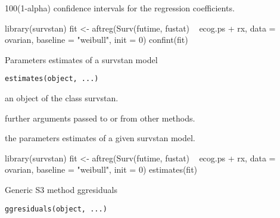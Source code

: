 \documentclass[letterpaper]{book}
\begin{document}
%
\begin{Value}
100(1-alpha) confidence intervals for the regression coefficients.
\end{Value}
%
\begin{Examples}
\begin{ExampleCode}

library(survstan)
fit <- aftreg(Surv(futime, fustat) ~ ecog.ps + rx, data = ovarian, baseline = "weibull", init = 0)
confint(fit)


\end{ExampleCode}
\end{Examples}
%
\begin{Description}\relax
Parameters estimates of a survstan model
\end{Description}
%
\begin{Usage}
\begin{verbatim}
estimates(object, ...)
\end{verbatim}
\end{Usage}
%
\begin{Arguments}
\begin{ldescription}
\item[\code{object}] an object of the class survstan.

\item[\code{...}] further arguments passed to or from other methods.
\end{ldescription}
\end{Arguments}
%
\begin{Value}
the parameters estimates of a given survstan model.
\end{Value}
%
\begin{Examples}
\begin{ExampleCode}

library(survstan)
fit <- aftreg(Surv(futime, fustat) ~ ecog.ps + rx, data = ovarian, baseline = "weibull", init = 0)
estimates(fit)


\end{ExampleCode}
\end{Examples}
%
\begin{Description}\relax
Generic S3 method ggresiduals
\end{Description}
%
\begin{Usage}
\begin{verbatim}
ggresiduals(object, ...)
\end{verbatim}
\end{Usage}
\end{document}

